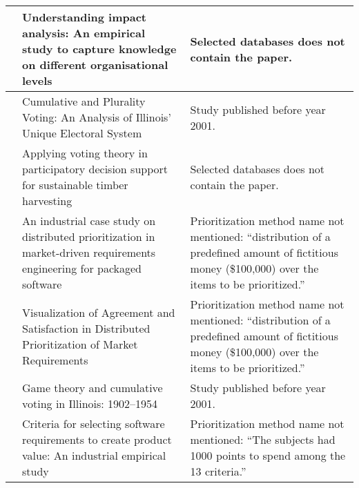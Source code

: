 {\begin{tabular}{
|>{\raggedright}p{}
|>{\raggedright}p{}
|>{\raggedright}p{}
|}
\citet{Jonsson2005a} & Understanding impact analysis: An empirical study to capture knowledge on different organisational levels &
Selected databases does not contain the paper.
\tabularnewline \hline

\citet{Kuklinski1973} & Cumulative and Plurality Voting: An Analysis of Illinois' Unique Electoral System &
Study published before year 2001.
\tabularnewline \hline

\citet{Laukkanen2004} & Applying voting theory in participatory decision support for sustainable timber harvesting &
Selected databases does not contain the paper.
\tabularnewline \hline

\citet{Regnell2001} & An industrial case study on distributed prioritization in market-driven requirements engineering for packaged software &
Prioritization method name not mentioned: ``distribution of a predefined amount of fictitious money (\$100,000) over the items to be prioritized.''
\tabularnewline \hline

\citet{Regnell2000} & Visualization of Agreement and Satisfaction in Distributed Prioritization of Market Requirements &
Prioritization method name not mentioned: ``distribution of a predefined amount of fictitious money (\$100,000) over the items to be prioritized.''
\tabularnewline \hline

\citet{Sawyer1962} & Game theory and cumulative voting in Illinois: 1902--1954 &
Study published before year 2001.
\tabularnewline \hline

\citet{Wohlin2006} & Criteria for selecting software requirements to create product value: An industrial empirical study &
Prioritization method name not mentioned: ``The subjects had 1000 points to spend among the 13 criteria.''
\tabularnewline \hline

\end{tabular}
}
